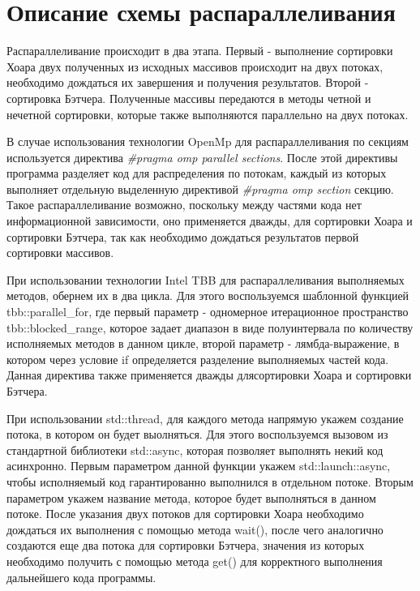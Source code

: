 \documentclass{report}
\begin{document}
\section*{Описание схемы распараллеливания}
\par Распараллеливание происходит в два этапа. Первый - выполнение сортировки Хоара двух полученных из исходных массивов происходит на двух потоках, необходимо дождаться их завершения и получения результатов. Второй - сортировка Бэтчера. Полученные массивы передаются в методы четной и нечетной сортировки, которые также выполняются параллельно на двух потоках.
\par В случае использования технологии OpenMp для распараллеливания по секциям используется директива \textsl{\#pragma omp parallel sections}. После этой директивы программа разделяет код для распределения по потокам, каждый из которых выполняет отдельную выделенную директивой \textsl{\#pragma omp section} секцию. Такое распараллеливание возможно, поскольку между частями кода нет информационной зависимости, оно применяется дважды, для сортировки Хоара и сортировки Бэтчера, так как необходимо дождаться результатов первой сортировки массивов.
\par При использовании технологии Intel TBB для распараллеливания выполняемых методов, обернем их в два цикла. Для этого воспользуемся шаблонной функцией tbb::parallel\_for, где первый параметр - одномерное итерационное пространство tbb::blocked\_range, которое задает диапазон в виде полуинтервала по количеству исполняемых методов в данном цикле, второй параметр - лямбда-выражение, в котором через условие if определяется разделение выполняемых частей кода. Данная директива также применяется дважды длясортировки Хоара и сортировки Бэтчера.
\par При использовании std::thread, для каждого метода напрямую укажем создание потока, в котором он будет выолняться. Для этого воспользуемся вызовом из стандартной библиотеки std::async, которая позволяет выполнять некий код асинхронно. Первым параметром данной функции укажем std::launch::async, чтобы исполняемый код гарантированно выполнился в отдельном потоке. Вторым параметром укажем название метода, которое будет выполняться в данном потоке. После указания двух потоков для сортировки Хоара необходимо дождаться их выполнения с помощью метода wait(), после чего аналогично создаются еще два потока для сортировки Бэтчера, значения из которых необходимо получить с помощью метода get() для корректного выполнения дальнейшего кода программы. 
\newpage
\end{document}
